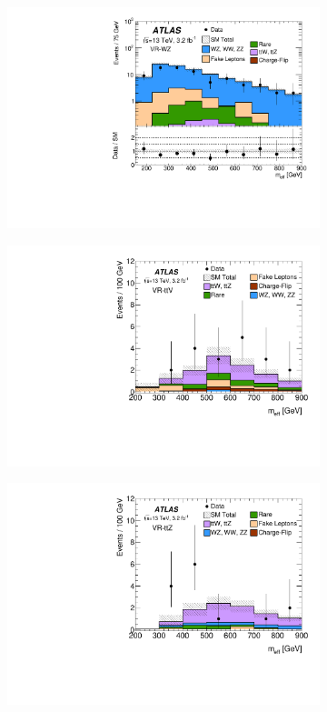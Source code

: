 \begin{figure}[p!]
\begin{subfigure}[t]{0.46\textwidth}
\caption{}\label{fig:VRc}\end{subfigure}
\begin{subfigure}[t]{0.46\textwidth}\includegraphics[width=\textwidth]{FIGURES/CONF_WZVR.pdf}
\caption{}\label{fig:VRd}\end{subfigure}
\begin{subfigure}[t]{0.46\textwidth}\includegraphics[width=\textwidth]{FIGURES/CONF_ttV2bInclVR.pdf}
\caption{}\label{fig:VRe}\end{subfigure}
\begin{subfigure}[t]{0.46\textwidth}\includegraphics[width=\textwidth]{FIGURES/CONF_ttZ1bInclVR.pdf}

\end{subfigure}
\end{figure}
